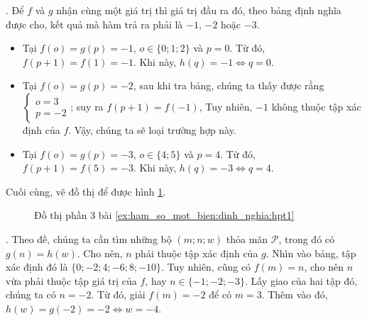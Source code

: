 . Để $f$ và $g$ nhận cùng một giá trị thì giá trị đầu ra đó, theo bảng định nghĩa được cho, kết quả mà hàm trả ra phải là $-1$, $-2$ hoặc $-3$.
\begin{itemize}
   \item Tại $f(o) = g(p) = -1$, $o \in \{0; 1; 2\}$ và $p = 0$. Từ đó, $f(p + 1) = f(1) = -1$. Khi này, $h(q) = -1 \iff q = 0$.
   \item Tại $f(o) = g(p) = -2$, sau khi tra bảng, chúng ta thấy được rằng $\begin{cases}o = 3\\p = -2\end{cases}$; suy ra $f(p + 1) = f(-1)$, Tuy nhiên, $-1$ không thuộc tập xác định của $f$. Vậy, chúng ta sẽ loại trường hợp này.
   \item Tại $f(o) = g(p) = -3$, $o \in \{4; 5\}$ và $p = 4$. Từ đó, $f(p + 1) = f(5) = -3$. Khi này, $h(q) = -3 \iff q = 4$.
\end{itemize}
Cuối cùng, vẽ đồ thị để được hình \ref{fig:hpt13}.

\begin{figure}[H]
   \centering
   \caption{Đồ thị phần 3 bài \ref{ex:ham_so_mot_bien:dinh_nghia:hpt1}}
   \label{fig:hpt13}
\end{figure}

. Theo đề, chúng ta cần tìm những bộ $(m;n;w)$ thỏa mãn $\mathcal{P}$, trong đó có $g(n) = h(w)$. Cho nên, $n$ phải thuộc tập xác định của $g$. Nhìn vào bảng, tập xác định đó là $\{0; -2; 4; -6; 8; -10\}$. Tuy nhiên, cũng có $f(m) = n$, cho nên $n$ vừa phải thuộc tập giá trị của $f$, hay $n \in \{-1; -2; -3\}$. Lấy giao của hai tập đó, chúng ta có $n = -2$. Từ đó, giải $f(m) = -2$ để có $m = 3$. Thêm vào đó, $h(w) = g(-2) = -2 \iff w = -4$.

